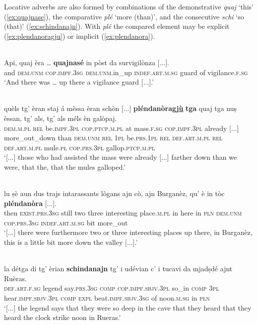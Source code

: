 Locative adverbs are also formed by combinations of the demonstrative \textit{quaj} `this' (\ref{ex:quajnase}), the comparative \textit{plé} `more (than)', and the consecutive \textit{schi} `so (that)' (\ref{ex:schindanajn}). With \textit{plé} the compared element may be explicit (\ref{ex:plendanoragju}) or implicit (\ref{ex:plendanora}).

\ea
\label{ex:quajnase}
\\
\gll  Api, quaj èra … \textbf{quajnasé} in pòst da survigilònza [...].\\
and \textsc{dem.unm} \textsc{cop.impf.3sg} {} \textsc{dem.unm}.in\_up \textsc{indef.art.m.sg} guard of vigilance.\textsc{f.sg}\\
\glt `And there was … up there a vigilance guard [...].'
\z

\ea
\label{ex:plendanoragju}
\\
\gll  [...] quèls tg’ èran staj á mèssa èran schòn [...] \textbf{pléndanòragj\underline{ù}} \textbf{tga} quaj tga nuṣ èssan, tg’ als, tg’ als méls èn galòpaj.\\
{} \textsc{dem.m.pl} \textsc{rel} be.\textsc{impf.3pl} \textsc{cop.ptcp.m.pl} at mass.\textsc{f.sg} \textsc{cop.impf.3pl} already [...] more\_out\_down than \textsc{dem.unm} \textsc{rel} \textsc{1pl} be.\textsc{prs.1pl} \textsc{rel} \textsc{def.art.m.pl} \textsc{rel} \textsc{def.art.m.pl} mule.\textsc{pl} \textsc{cop.prs.3pl} gallop.\textsc{ptcp.m.pl}\\
\glt `[...] those who had assisted the mass were already [...] farther down than we were, that the, that the mules galloped.'
\z

\ea
\label{ex:plendanora}
\\
\gll [...] lu ṣè aun dus trajs intarassants lògans ajn cò, ajn Burganèz, qu' è in tòc \textbf{pléndanòra} [...].\\
{}  then \textsc{exist.prs.3sg} still two three interesting place.\textsc{m.pl} in here in \textsc{pln} \textsc{dem.unm} \textsc{cop.prs.3sg} \textsc{indef.art.m.sg} bit more\_out \\
\glt `[...] there were furthermore two or three interesting places up there, in Burganèz, this is a little bit more down the valley [...].'
\z

\ea
\label{ex:schindanajn}
\\
\gll [...] la détga di tg’ èrian \textbf{schindanajn} tg' i udévian c’ i tucavi da mjadṣdé ajnt Ruèras.\\
{} \textsc{def.art.f.sg} legend say.\textsc{prs.3sg}  \textsc{comp} \textsc{cop.impf.sbjv.3pl} so\_in \textsc{comp} \textsc{3pl} hear.\textsc{impf.sbjv.3pl} \textsc{comp} \textsc{expl} beat.\textsc{impf.sbjv.3sg} of noon.\textsc{m.sg} in \textsc{pln}\\
\glt `[...] the legend says that they were so deep in the cave that they heard that they heard the clock strike noon in Rueras.'
\z


